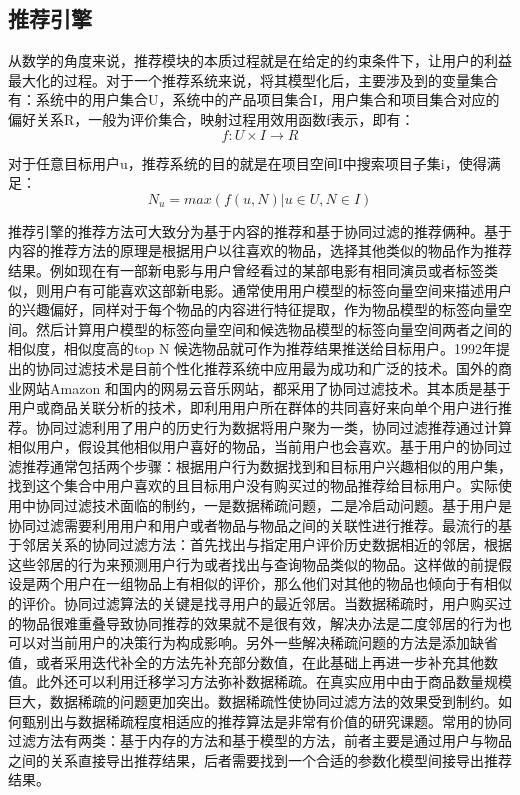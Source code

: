 	\subsection{推荐引擎}
	从数学的角度来说，推荐模块的本质过程就是在给定的约束条件下，让用户的利益最大化的过程。对于一个推荐系统来说，将其模型化后，主要涉及到的变量集合有：系统中的用户集合U，系统中的产品项目集合I，用户集合和项目集合对应的偏好关系R，一般为评价集合，映射过程用效用函数f表示，即有：
	\begin{equation}
		f:U \times I \rightarrow R 
		\label{recmd_mapping}
	\end{equation}

	对于任意目标用户u，推荐系统的目的就是在项目空间I中搜索项目子集i，使得满足：
	 \begin{equation}
		N_{u}={max(f(u,N) | u\in U,N\in I)}
		\label{recmd_mapping}
	 \end{equation}

	推荐引擎的推荐方法可大致分为基于内容的推荐和基于协同过滤的推荐俩种。基于内容的推荐方法的原理是根据用户以往喜欢的物品，选择其他类似的物品作为推荐结果。例如现在有一部新电影与用户曾经看过的某部电影有相同演员或者标签类似，则用户有可能喜欢这部新电影。通常使用用户模型的标签向量空间来描述用户的兴趣偏好，同样对于每个物品的内容进行特征提取，作为物品模型的标签向量空间。然后计算用户模型的标签向量空间和候选物品模型的标签向量空间两者之间的相似度，相似度高的top N 候选物品就可作为推荐结果推送给目标用户。1992年提出的协同过滤技术是目前个性化推荐系统中应用最为成功和广泛的技术。国外的商业网站Amazon 和国内的网易云音乐网站，都采用了协同过滤技术。其本质是基于用户或商品关联分析的技术，即利用用户所在群体的共同喜好来向单个用户进行推荐。协同过滤利用了用户的历史行为数据将用户聚为一类，协同过滤推荐通过计算相似用户，假设其他相似用户喜好的物品，当前用户也会喜欢。基于用户的协同过滤推荐通常包括两个步骤：根据用户行为数据找到和目标用户兴趣相似的用户集，找到这个集合中用户喜欢的且目标用户没有购买过的物品推荐给目标用户。实际使用中协同过滤技术面临的制约，一是数据稀疏问题，二是冷启动问题。基于用户是协同过滤需要利用用户和用户或者物品与物品之间的关联性进行推荐。最流行的基于邻居关系的协同过滤方法：首先找出与指定用户评价历史数据相近的邻居，根据这些邻居的行为来预测用户行为或者找出与查询物品类似的物品。这样做的前提假设是两个用户在一组物品上有相似的评价，那么他们对其他的物品也倾向于有相似的评价。协同过滤算法的关键是找寻用户的最近邻居。当数据稀疏时，用户购买过的物品很难重叠导致协同推荐的效果就不是很有效，解决办法是二度邻居的行为也可以对当前用户的决策行为构成影响。另外一些解决稀疏问题的方法是添加缺省值，或者采用迭代补全的方法先补充部分数值，在此基础上再进一步补充其他数值。此外还可以利用迁移学习方法弥补数据稀疏。在真实应用中由于商品数量规模巨大，数据稀疏的问题更加突出。数据稀疏性使协同过滤方法的效果受到制约。如何甄别出与数据稀疏程度相适应的推荐算法是非常有价值的研究课题。常用的协同过滤方法有两类：基于内存的方法和基于模型的方法，前者主要是通过用户与物品之间的关系直接导出推荐结果，后者需要找到一个合适的参数化模型间接导出推荐结果。

